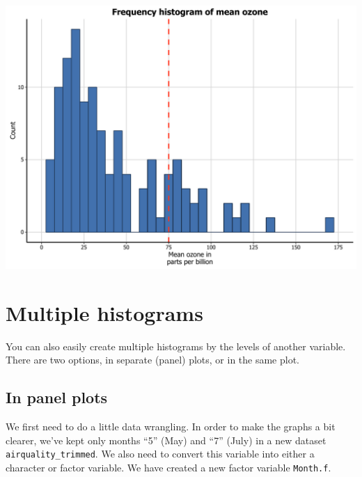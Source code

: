 \begin{Shaded}
\begin{Highlighting}[]
\StringTok{        } \NormalTok{(), }
\StringTok{        } \NormalTok{(), } \NormalTok{(),}
\StringTok{        } \NormalTok{(} \NormalTok{, } \NormalTok{, } \NormalTok{),}
\StringTok{        }\NormalTok{(}\NormalTok{))}
\end{Highlighting}
\end{Shaded}

\begin{center}\includegraphics[width=0.55\linewidth]{figures/histogram_17-1} \end{center}

\section{Multiple histograms}\label{multiple-histograms}

You can also easily create multiple histograms by the levels of another
variable. There are two options, in separate (panel) plots, or in the
same plot.

\subsection{In panel plots}\label{in-panel-plots}

We first need to do a little data wrangling. In order to make the graphs
a bit clearer, we've kept only months ``5'' (May) and ``7'' (July) in a
new dataset \texttt{airquality\_trimmed}. We also need to convert this
variable into either a character or factor variable. We have created a
new factor variable \texttt{Month.f}.

